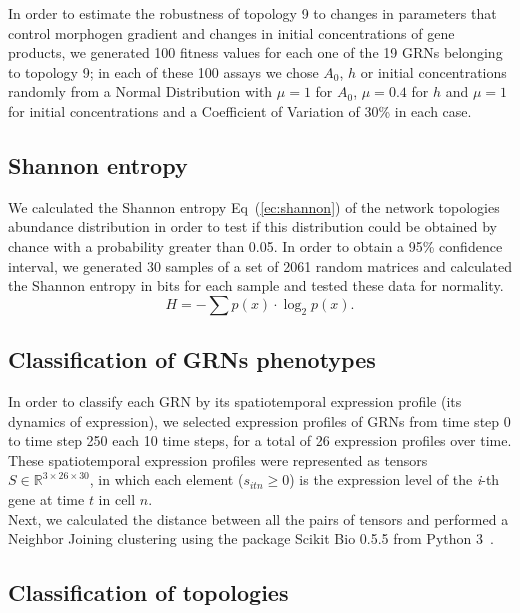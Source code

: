\documentclass[10pt,letterpaper]{article}
\begin{document}
In order to estimate the robustness of topology 9 to changes in parameters that
control morphogen gradient and changes in initial concentrations of gene
products, we generated 100 fitness values for each one of the 19 GRNs
belonging to topology 9; in each of these 100 assays we chose $A_0$, $h$ or
initial concentrations randomly from a Normal Distribution with $\mu = 1$ for
$A_0$, $\mu = 0.4$ for $h$ and $\mu = 1$ for initial concentrations and a
Coefficient of Variation of 30\% in each case.

\subsection*{Shannon entropy}

We calculated the Shannon entropy Eq~(\ref{ec:shannon}) of the network
topologies abundance distribution in order to test if this distribution could be obtained
by chance with a probability greater than 0.05. In order to obtain a 95\%
confidence interval, we generated 30 samples of a set of 2061 random matrices
and calculated the Shannon entropy in bits for each sample and tested these data
for normality.
\begin{equation}
 H = -\sum p(x) \cdot \log_{2}p(x).
 \label{ec:shannon}
\end{equation}

\subsection*{Classification of GRNs phenotypes}

In order to classify each GRN by its spatiotemporal expression profile (its
dynamics of expression), we selected expression profiles of GRNs from time step
0 to time step 250 each 10 time steps, for a total of 26 expression profiles
over time. These spatiotemporal expression profiles were represented as tensors
$S \in \mathbb{R}^{3 \times 26 \times 30}$, in which each element ($s_{itn} \geq
0$) is the expression level of the \emph{i}-th gene at time $t$ in cell $n$.\\

Next, we calculated the distance between all the pairs of tensors and performed
a Neighbor Joining clustering using the package Scikit Bio 0.5.5 from
Python 3~\cite{skbio2020}.

\subsection*{Classification of topologies}
\end{document}

